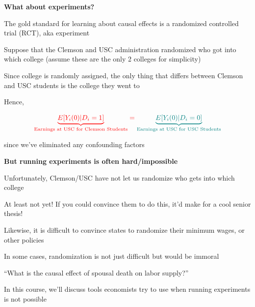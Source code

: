 \documentclass[11pt, aspectratio=169]{beamer}
\newenvironment{wideitemize}{\itemize\addtolength{\itemsep}{5pt}}{\enditemize}
\begin{document}
\begin{frame}{\bf \large What about experiments?}
\begin{wideitemize}
\item
The gold standard for learning about causal effects is a randomized controlled trial (RCT), aka experiment

\item
Suppose that the Clemson and USC administration randomized who got into which college (assume these are the only 2 colleges for simplicity)

\item
Since college is randomly assigned, the only thing that differs between Clemson and USC students is the college they went to

\item
Hence, 

		$$ \color{red}{ \underbrace{E[ Y_i(0) | D_i=1  ] }_{\text{Earnings at USC for Clemson Students}}} = \color{teal}{ \underbrace{E[ Y_i(0) | D_i=0 ] }_{\text{Earnings at USC for USC Students}}}$$
		
		since we've eliminated any confounding factors


\end{wideitemize}
\end{frame}

\begin{frame}{\bf \large But running experiments is often hard/impossible}
	\begin{wideitemize}
	
	\item
	Unfortunately, Clemson/USC have not let us randomize who gets into which college
		\begin{wideitemize}
			\item
			At least not yet! If you could convince them to do this, it'd make for a cool senior thesis! 
		\end{wideitemize}


	\item
	Likewise, it is difficult to convince states to randomize their minimum wages, or other policies
	
	\item
	In some cases, randomization is not just difficult but would be immoral 
	
		\begin{wideitemize}
			\item 
			``What is the causal effect of spousal death on labor supply?''
		\end{wideitemize}	
	
	\item
	In this course, we'll discuss tools economists try to use when running experiments is not possible
	\end{wideitemize}
\end{frame}
\end{document}
